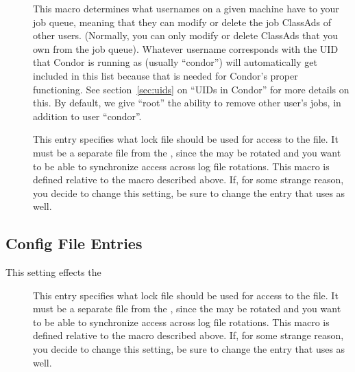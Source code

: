\begin{description}
\item[] \label{param:QueueSuperUsers} This
  macro determines what usernames on a given machine have
   to your job queue, meaning that they can
  modify or delete the job ClassAds of other users.  (Normally, you
  can only modify or delete ClassAds that you own from the job queue).
  Whatever username corresponds with the UID that Condor is running as
  (usually ``condor'') will automatically get included in this list
  because that is needed for Condor's proper functioning.  See
  section~\ref{sec:uids} on ``UIDs in Condor'' for more details on
  this.  By default, we give ``root'' the ability to remove other
  user's jobs, in addition to user ``condor''.
      
\item[] \label{param:ScheddLock} This entry
  specifies what lock file should be used for access to the
   file.  It must be a separate file from the
  , since the  may be rotated and you
  want to be able to synchronize access across log file rotations.
  This macro is defined relative to the  macro described
  above.  If, for some strange reason, you decide to change this
  setting, be sure to change the  entry that
   uses as well.

\end{description}

\subsection{ Config File Entries}
\label{sec:Shadow-Config-File-Entries}

This setting effects the 

\begin{description}
  
\item[] \label{param:ShadowLock} This entry
  specifies what lock file should be used for access to the
   file.  It must be a separate file from the
  , since the  may be rotated and you
  want to be able to synchronize access across log file rotations.
  This macro is defined relative to the  macro described
  above.  If, for some strange reason, you decide to change this
  setting, be sure to change the  entry that
   uses as well.

\end{description}

